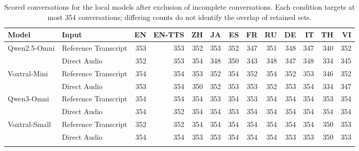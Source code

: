 \begin{table}[htbp]
\centering
\caption{Scored conversations for the local models after exclusion of incomplete conversations. Each condition targets at most 354 conversations; differing counts do not identify the overlap of retained sets.}
\label{tab:open_coverage}
\begingroup
\fontsize{8}{9.6}\selectfont
\setlength{\tabcolsep}{1pt}
\renewcommand{\arraystretch}{1.06}
\begin{tabular*}{\linewidth}{@{}l@{\hspace{5pt}}l@{\extracolsep{\fill}}*{11}{r}@{}}
\toprule
\textbf{Model} & \textbf{Input} & \textbf{EN} & \textbf{EN-TTS} & \textbf{ZH} & \textbf{JA} & \textbf{ES} & \textbf{FR} & \textbf{RU} & \textbf{DE} & \textbf{IT} & \textbf{TH} & \textbf{VI} \\
\midrule
Qwen2.5-Omni & Reference Transcript & 353 & 353 & 352 & 353 & 352 & 347 & 351 & 348 & 347 & 340 & 352 \\
 & Direct Audio & 352 & 353 & 354 & 348 & 350 & 343 & 348 & 347 & 348 & 334 & 345 \\
\addlinespace[3pt]
Voxtral-Mini & Reference Transcript & 354 & 354 & 353 & 352 & 354 & 352 & 354 & 352 & 353 & 346 & 352 \\
 & Direct Audio & 353 & 354 & 350 & 352 & 353 & 353 & 352 & 353 & 354 & 334 & 347 \\
\addlinespace[3pt]
Qwen3-Omni & Reference Transcript & 354 & 354 & 354 & 353 & 354 & 353 & 354 & 354 & 354 & 353 & 354 \\
 & Direct Audio & 354 & 352 & 354 & 354 & 353 & 354 & 354 & 354 & 354 & 354 & 354 \\
\addlinespace[3pt]
Voxtral-Small & Reference Transcript & 352 & 352 & 354 & 354 & 354 & 354 & 354 & 354 & 354 & 350 & 353 \\
 & Direct Audio & 354 & 354 & 353 & 353 & 354 & 354 & 354 & 353 & 353 & 350 & 353 \\
\addlinespace[3pt]
\bottomrule
\end{tabular*}
\endgroup
\end{table}


